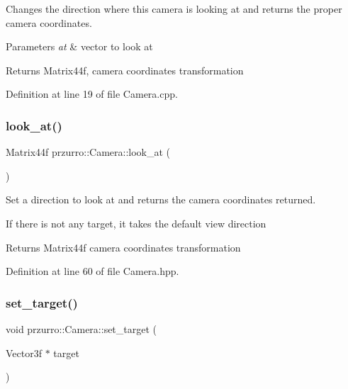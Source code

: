 Changes the direction where this camera is looking at and returns the proper camera coordinates. 


\begin{DoxyParams}{Parameters}
{\em at} & vector to look at \\
\hline
\end{DoxyParams}
\begin{DoxyReturn}{Returns}
Matrix44f, camera coordinates transformation 
\end{DoxyReturn}


Definition at line 19 of file Camera.\+cpp.

\mbox{\label{classprzurro_1_1_camera_adcddf45e2cd4d5cf6badf0a2a615e3dd}} 
\subsubsection{\texorpdfstring{look\_at()}{look\_at()}\hspace{0.1cm}{\footnotesize\ttfamily [2/2]}}
{\footnotesize\ttfamily Matrix44f przurro\+::\+Camera\+::look\+\_\+at (\begin{DoxyParamCaption}{ }\end{DoxyParamCaption})\hspace{0.3cm}{\ttfamily [inline]}}



Set a direction to look at and returns the camera coordinates returned. 

If there is not any target, it takes the default view direction

\begin{DoxyReturn}{Returns}
Matrix44f camera coordinates transformation 
\end{DoxyReturn}


Definition at line 60 of file Camera.\+hpp.

\mbox{\label{classprzurro_1_1_camera_ae38799bb62452f5bcf4d9f0f123adeac}} 
\subsubsection{\texorpdfstring{set\_target()}{set\_target()}}
{\footnotesize\ttfamily void przurro\+::\+Camera\+::set\+\_\+target (\begin{DoxyParamCaption}\item[{Vector3f $\ast$}]{target }\end{DoxyParamCaption})\hspace{0.3cm}{\ttfamily [inline]}}



